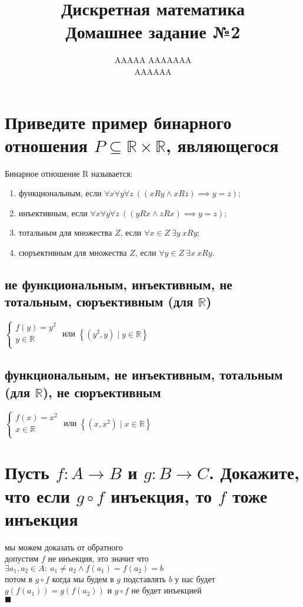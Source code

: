 \documentclass{article}
\title{Дискретная математика \\ Домашнее задание №2}
\author{AAAAA AAAAAAA \\ AAAAAA}
\newcommand{\R}{\mathbb{R}}
\renewcommand{\l}{\left}
\renewcommand{\r}{\right}
\begin{document}
  \maketitle

  \section{Приведите пример бинарного отношения $P \subseteq \R \times \R$, являющегося}
  Бинарное отношение R называется: %
  \begin{enumerate}
    \item функциональным, если $\forall x\forall y\forall z\ ((xRy \land xRz) \implies y = z)$;
    \item инъективным, если $\forall x\forall y\forall z\ ((yRx \land zRx) \implies y = z)$;
    \item тотальным для множества $Z$, если $\forall x \in Z\ \exists y\ xRy$;
    \item сюръективным для множества $Z$, если $\forall y \in Z\ \exists x\ xRy$.
  \end{enumerate}
  \subsection{не функциональным, инъективным, не тотальным, сюръективным (для $\R$)}
  $\begin{cases}
    f(y) = y^2 \\
    y \in \R \\
  \end{cases}$ или $ \l\{(y^2, y) \mid y \in \R\r\}$
  \subsection{функциональным, не инъективным, тотальным (для $\R$), не сюръективным}
  $\begin{cases}
    f(x) = x^2 \\
    x \in \R \\
  \end{cases}$ или $ \l\{(x, x^2) \mid x \in \R\r\}$

  \section{Пусть $f : A \to B$ и $g : B \to C$. Докажите, что если $g \circ f$ инъекция, то $f$ тоже инъекция}
  мы можем доказать от обратного \\
  допустим $f$ не инъекция, это значит что $\exists a_1,a_2\in A:\ a_1\neq a_2 \land f(a_1)=f(a_2)=b $ \\
  потом в $g \circ f$ когда мы будем в $g$ подставлять $b$ у нас будет $g\l(f\l(a_1\r)\r) = g\l(f\l(a_2\r)\r)$
  и $g \circ f$ не будет инъекцией \\
  $\blacksquare$
\end{document}
